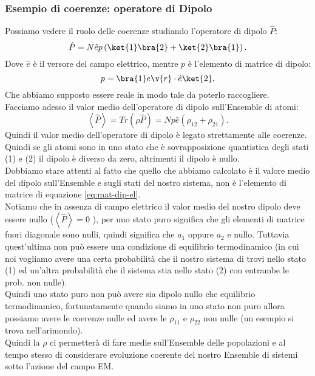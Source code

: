 \subsubsection{Esempio di coerenze: operatore di Dipolo}%
Possiamo vedere il ruolo delle coerenze studiando l'operatore di dipolo $\hat{P}$:
\[
    \hat{P}= N\hat{e}p\left(\ket{1}\bra{2}+ \ket{2}\bra{1}\right)
.\]
Dove $\hat{e}$ è il versore del campo elettrico, mentre $p$ è l'elemento di matrice di dipolo:
\[
    p = \bra{1}e\v{r}\cdot \hat{e}\ket{2} \label{eq:mat-dip-el}
.\] 
Che abbiamo supposto essere reale in modo tale da poterlo raccogliere. \\
Facciamo adesso il valor medio dell'operatore di dipolo sull'Ensemble di atomi:
\[
    \left<\hat{P}\right>= Tr\left(\rho\hat{P}\right) =
    Np\hat{e}\left(\rho_{12}+\rho_{21}\right)
.\] 
Quindi il valor medio dell'operatore di dipolo è legato strettamente alle coerenze. Quindi se gli atomi sono in uno stato che è sovrapposizione quantistica degli stati (1) e (2) il dipolo è diverso da zero, altrimenti il dipolo è nullo. \\
Dobbiamo stare attenti al fatto che quello che abbiamo calcolato  è il valore medio del dipolo sull'Ensemble e sugli stati del nostro sistema, non è l'elemento di matrice di equazione \ref{eq:mat-dip-el}.\\
Notiamo che in assenza di campo elettrico il valor medio del nostro dipolo deve essere nullo ($\left<\hat{P}\right>=0$ ), per uno stato puro significa che gli elementi di matrice fuori diagonale sono nulli, quindi significa che $a_1$  oppure $a_2$  e nullo. Tuttavia quest'ultima non può essere una condizione di equilibrio termodinamico (in cui noi vogliamo avere una certa probabilità che il nostro sistema di trovi nello stato (1) ed un'altra probabilità che il sistema stia nello stato (2) con entrambe le prob. non nulle).\\
Quindi uno stato puro non può avere sia dipolo nullo che equilibrio termodinamico, fortunatamente quando siamo in uno stato non puro allora possiamo avere le coerenze nulle ed avere le $\rho_{11}$ e $\rho_{22}$  non nulle (un esempio si trova nell'arimondo).\\
Quindi la $\rho$ ci permetterà di fare medie sull'Ensemble delle popolazioni e al tempo stesso di considerare evoluzione coerente del nostro Ensemble di sistemi sotto l'azione del campo EM.

